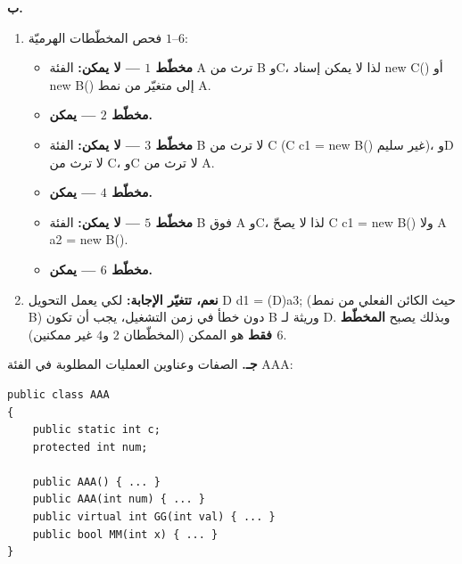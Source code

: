 \begin{boxSolution}
\textbf{ب.}
\begin{enumerate}[label=\textbf{(\arabic*)}, itemsep=0.35em]
    \item فحص المخطّطات الهرميّة $1$–$6$:
    \begin{itemize}[itemsep=0.25em]
        \item \textbf{مخطّط $1$ — لا يمكن:} الفئة \textenglish{A} ترث من \textenglish{B} و\textenglish{C}، لذا لا يمكن إسناد \textenglish{new C()} أو \textenglish{new B()} إلى متغيّر من نمط \textenglish{A}.
        \item \textbf{مخطّط $2$ — يمكن.}
        \item \textbf{مخطّط $3$ — لا يمكن:} الفئة \textenglish{B} لا ترث من \textenglish{C} (\textenglish{C c1 = new B()} غير سليم)، و\textenglish{D} لا ترث من \textenglish{C}، و\textenglish{C} لا ترث من \textenglish{A}.
        \item \textbf{مخطّط $4$ — يمكن.}
        \item \textbf{مخطّط $5$ — لا يمكن:} الفئة \textenglish{B} فوق \textenglish{A} و\textenglish{C}، لذا لا يصحّ \textenglish{C c1 = new B()} ولا \textenglish{A a2 = new B()}.
        \item \textbf{مخطّط $6$ — يمكن.}
    \end{itemize}

    \item \textbf{نعم، تتغيّر الإجابة:} لكي يعمل التحويل \textenglish{D d1 = (D)a3;} (حيث الكائن الفعلي من نمط \textenglish{B}) دون خطأ في زمن التشغيل، يجب أن تكون \textenglish{B} وريثة لـ \textenglish{D}. وبذلك يصبح \textbf{المخطّط $6$ فقط} هو الممكن (المخطّطان $2$ و$4$ غير ممكنين).
\end{enumerate}

\textbf{جـ.} الصفات وعناوين العمليات المطلوبة في الفئة \textenglish{AAA}:
\begin{boxCode}
\begin{english}
\begin{verbatim}
public class AAA
{
    public static int c;
    protected int num;

    public AAA() { ... }
    public AAA(int num) { ... }
    public virtual int GG(int val) { ... }
    public bool MM(int x) { ... }
}
\end{verbatim}
\end{english}
\end{boxCode}
\end{boxSolution}
\fi
\filbreak
